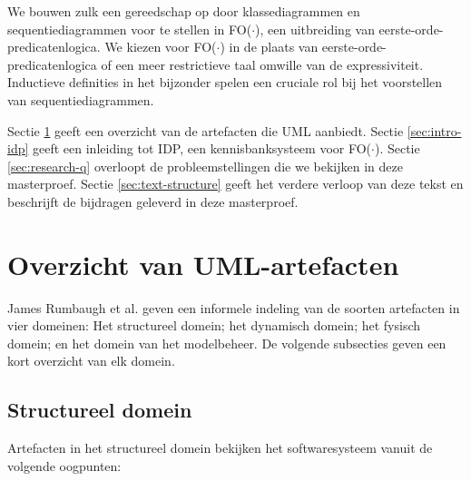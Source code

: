 We bouwen zulk een gereedschap op door klassediagrammen en sequentiediagrammen voor te stellen in FO($\cdot$), een uitbreiding van eerste-orde-predicatenlogica. We kiezen voor FO($\cdot$) in de plaats van eerste-orde-predicatenlogica of een meer restrictieve taal omwille van de expressiviteit. Inductieve definities in het bijzonder spelen een cruciale rol bij het voorstellen van sequentiediagrammen.

Sectie \ref{sec:uml-artifacts} geeft een overzicht van de artefacten die UML aanbiedt. Sectie \ref{sec:intro-idp} geeft een inleiding tot IDP\cite{DeCatBroes2014PLaa}, een kennisbanksysteem voor FO($\cdot$). Sectie \ref{sec:research-q} overloopt de probleemstellingen die we bekijken in deze masterproef. Sectie \ref{sec:text-structure} geeft het verdere verloop van deze tekst en beschrijft de bijdragen geleverd in deze masterproef.

\section{Overzicht van UML-artefacten}\label{sec:uml-artifacts}

James Rumbaugh et al.\cite{RumbaughJames2005Tuml} geven een informele indeling van de soorten artefacten in vier domeinen: Het structureel domein; het dynamisch domein; het fysisch domein; en het domein van het modelbeheer. De volgende subsecties geven een kort overzicht van elk domein.

\subsection{Structureel domein}

Artefacten in het structureel domein bekijken het softwaresysteem vanuit de volgende oogpunten:

